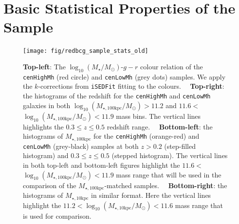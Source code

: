 \documentclass[a4paper,fleqn,usenatbib]{mnras}
\def\rbcg{\texttt{cenHighMh}}
\def\nbcg{\texttt{cenLowMh}}
\def\logms{{$\log_{10} (M_{\star}/M_{\odot})$}}
\def\minn{{$M_{\star,10\mathrm{kpc}}$}}
\def\mtot{{$M_{\star,100\mathrm{kpc}}$}}
\def\logminn{{$\log_{10} (M_{\star,10\mathrm{kpc}}/M_{\odot})$}}
\def\logmtot{{$\log_{10} (M_{\star,100\mathrm{kpc}}/M_{\odot})$}}
\begin{document}



\clearpage

\clearpage


\appendix


\section{Basic Statistical Properties of the Sample} 
	\label{app:basic} 
    
  \begin{figure}
      \centering 
      \texttt{[image: fig/redbcg\_sample\_stats\_old]}
      \caption{
          \textbf{Top-left}: The \logms{}-$g-r$ colour relation of the \rbcg{} 
          (red circle) and \nbcg{} (grey dots) samples.
          We apply the $k$-corrections from \texttt{iSEDFit} fitting to the colours.~~          
          \textbf{Top-right}: the histograms of the redshift for the \rbcg{} and 
          \nbcg{} galaxies in both \logmtot$>11.2$ and $11.6<$\logmtot{}$<11.9$
          mass bins.
          The vertical lines highlights the $0.3\leq z \leq 0.5$ redshift range.~~
          \textbf{Bottom-left}: the histograms of \mtot{} for the \rbcg{} (orange-red) 
          and \nbcg{} (grey-black) samples at both $z>0.2$ (step-filled histogram) and 
          $0.3 \leq z \leq 0.5$ (stepped histogram). 
          The vertical lines in both top-left and bottom-left figures highlight the 
          $11.6<$\logmtot{}$<11.9$ mass range that will be used in the comparison of 
          the \mtot{}-matched samples.~~
          \textbf{Bottom-right}: the histograms of \minn{} in similar format. 
          Here the vertical lines highlight the 
          $11.2<$\logminn{}$<11.6$ mass range that is used for comparison.
      }
      \label{fig:sample_stats}
  \end{figure}
\end{document}
